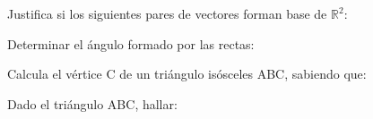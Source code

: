 \documentclass[addpoints,spanish, 12pt,a4paper]{exam}
\begin{document}
        \begin{questions}
        \question Justifica si los siguientes pares de vectores forman base de $\mathbb{R}^2$:
        \begin{multicols}{1} 
        \end{multicols}
        \question Determinar el ángulo formado por las rectas:
        \begin{multicols}{1} 
        \end{multicols}
        \question Calcula el vértice C de un triángulo isósceles ABC, sabiendo que:
        \begin{multicols}{1} 
        \end{multicols}
        \question Dado el triángulo ABC, hallar: \\ 

\end{questions}
\end{document}
